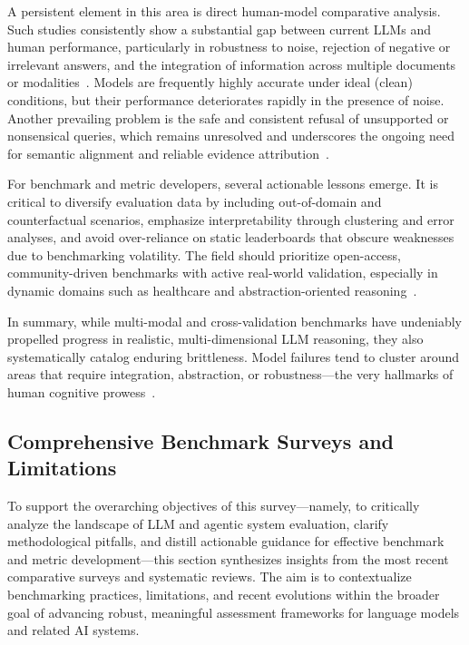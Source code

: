 \documentclass[sigconf]{acmart}
\begin{document}
A persistent element in this area is direct human-model comparative analysis. Such studies consistently show a substantial gap between current LLMs and human performance, particularly in robustness to noise, rejection of negative or irrelevant answers, and the integration of information across multiple documents or modalities~\cite{ref92,ref94,ref95}. Models are frequently highly accurate under ideal (clean) conditions, but their performance deteriorates rapidly in the presence of noise. Another prevailing problem is the safe and consistent refusal of unsupported or nonsensical queries, which remains unresolved and underscores the ongoing need for semantic alignment and reliable evidence attribution~\cite{ref94,ref95}.

For benchmark and metric developers, several actionable lessons emerge. It is critical to diversify evaluation data by including out-of-domain and counterfactual scenarios, emphasize interpretability through clustering and error analyses, and avoid over-reliance on static leaderboards that obscure weaknesses due to benchmarking volatility. The field should prioritize open-access, community-driven benchmarks with active real-world validation, especially in dynamic domains such as healthcare and abstraction-oriented reasoning~\cite{ref92,ref94,ref95}.

In summary, while multi-modal and cross-validation benchmarks have undeniably propelled progress in realistic, multi-dimensional LLM reasoning, they also systematically catalog enduring brittleness. Model failures tend to cluster around areas that require integration, abstraction, or robustness---the very hallmarks of human cognitive prowess~\cite{ref79,ref85,ref92,ref94,ref95}.

\subsection{Comprehensive Benchmark Surveys and Limitations}

To support the overarching objectives of this survey---namely, to critically analyze the landscape of LLM and agentic system evaluation, clarify methodological pitfalls, and distill actionable guidance for effective benchmark and metric development---this section synthesizes insights from the most recent comparative surveys and systematic reviews. The aim is to contextualize benchmarking practices, limitations, and recent evolutions within the broader goal of advancing robust, meaningful assessment frameworks for language models and related AI systems.
\end{document}
